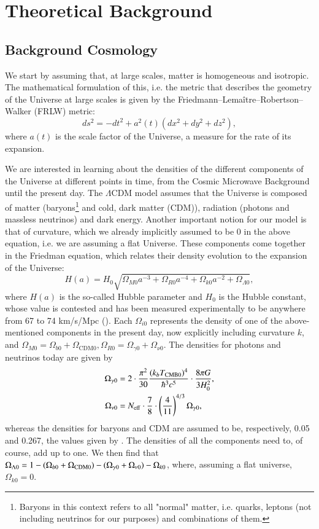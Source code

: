 \documentclass{aa}
\begin{document}
\section{Theoretical Background}

\subsection{Background Cosmology}

We start by assuming that, at large scales, matter is homogeneous and isotropic. The mathematical formulation of this, i.e. the metric that describes the geometry of the Universe at large scales is given by the Friedmann–Lemaître–Robertson–Walker (FRLW) metric:
\begin{equation}
ds^2 = -dt^2 + a^2(t)(dx^2 + dy^2 + dz^2),
\end{equation}
where $a(t)$ is the scale factor of the Universe, a measure for the rate of its expansion.

We are interested in learning about the densities of the different components of the Universe at different points in time, from the Cosmic Microwave Background until the present day. The $\Lambda$CDM model assumes that the Universe is composed of matter (baryons\footnote{Baryons in this context refers to all "normal" matter, i.e. quarks, leptons (not including neutrinos for our purposes) and combinations of them.} and cold, dark matter (CDM)), radiation (photons and massless neutrinos) and dark energy. Another important notion for our model is that of curvature, which we already implicitly assumed to be 0 in the above equation, i.e. we are assuming a flat Universe. These components come together in the Friedman equation, which relates their density evolution to the expansion of the Universe:
\begin{equation}
H(a) = H_0 \sqrt{\Omega_{M0}a^{-3} + \Omega_{R0}a^{-4} + \Omega_{k 0} a^{-2} + \Omega_{\Lambda 0}},
\end{equation}
where $H(a)$ is the so-called Hubble parameter and $H_0$ is the Hubble constant, whose value is contested and has been measured experimentally to be anywhere from 67 to 74 km/s/Mpc (\cite{hu2023hubbletensionevidencenew}). Each $\Omega_{i0}$ represents the density of one of the above-mentioned components in the present day, now explicitly including curvature $k$, and $\Omega_{M0} = \Omega_{b0} + \Omega_\text{CDM0}, \Omega_{R0} = \Omega_{\gamma0} + \Omega_{\nu0}$. The densities for photons and neutrinos today are given by
\begin{align}
\Omega_{\gamma 0} &= 2\cdot \frac{\pi^2}{30} \frac{(k_bT_{\rm CMB 0})^4}{\hbar^3 c^5} \cdot \frac{8\pi G}{3H_0^2},\\
\Omega_{\nu 0} &= N_{\rm eff}\cdot \frac{7}{8}\cdot \left(\frac{4}{11}\right)^{4/3}\Omega_{\gamma 0},
\end{align}
whereas the densities for baryons and CDM are assumed to be, respectively, 0.05 and 0.267, the values given by \cite{2020}. The densities of all the components need to, of course, add up to one. We then find that 
$\Omega_{\Lambda 0} = 1 - (\Omega_{b 0}+\Omega_{\rm CDM 0}) - (\Omega_{\gamma 0} + \Omega_{\nu 0}) - \Omega_{k 0}$, where, assuming a flat universe, $\Omega_{k 0} = 0$.
\end{document}

